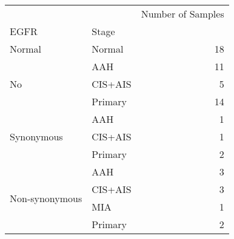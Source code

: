 \begin{tabular}{l|lr}
\toprule
               &         & Number of Samples \\
EGFR & Stage &                   \\
\midrule
Normal & Normal &                18 \\
\multirow{3}{*}{No} & AAH &                11 \\
               & CIS+AIS &                 5 \\
               & Primary &                14 \\
\cline{1-3}
\multirow{3}{*}{Synonymous} & AAH &                 1 \\
               & CIS+AIS &                 1 \\
               & Primary &                 2 \\
\cline{1-3}
\multirow{4}{*}{Non-synonymous} & AAH &                 3 \\
               & CIS+AIS &                 3 \\
               & MIA &                 1 \\
               & Primary &                 2 \\
\bottomrule
\end{tabular}
